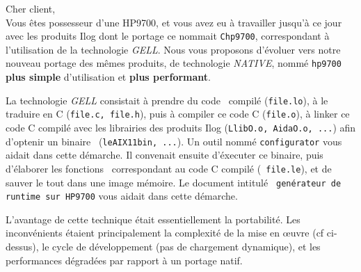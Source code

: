 

\frenchspacing
\setlength{\parindent}{0in}
\setlength{\parskip}{3ex}
\raggedbottom


\bigskip

Cher client, \\
Vous \^{e}tes possesseur d'une HP9700, et 
vous avez eu \`{a} travailler jusqu'\`{a} ce jour avec les produits Ilog
dont le portage ce nommait {\tt Chp9700}, correspondant \`{a}
l'utilisation de la technologie {\it GELL}. Nous vous proposons
d'\'{e}voluer vers notre nouveau portage des m\^{e}mes produits, de
technologie {\it NATIVE}, nomm\'{e} {\tt hp9700} {\bf plus simple}
d'utilisation et {\bf plus performant}. 
\par

La technologie {\it GELL} consistait \`{a} prendre du code
\LeLisp\ compil\'{e} ({\tt file.lo}), \`{a} le traduire en C ({\tt file.c,
file.h}), puis \`{a} compiler ce code C ({\tt file.o}), \`{a} linker ce code
C compil\'{e} avec les librairies des produits Ilog ({\tt LlibO.o,
AidaO.o, ...}) afin d'optenir un binaire \LeLisp\ ({\tt leAIX11bin,
...}). Un outil nomm\'{e} {\tt configurator} vous aidait dans cette d\'{e}marche.
Il convenait ensuite d'\'{e}xecuter ce binaire, puis d'\'{e}laborer
les fonctions \LeLisp\ correspondant au code C compil\'{e} ({\tt
file.le}), et de sauver le tout dans une image m\'{e}moire. Le document
intitul\'{e} {\tt
gen\'{e}rateur de runtime sur HP9700} vous aidait dans cette d\'{e}marche.
\par
L'avantage de cette technique \'{e}tait essentiellement la
portabilit\'{e}. Les inconv\'{e}nients \'{e}taient principalement la
complexit\'{e} de la mise en \oe uvre (cf ci-dessus), le cycle de
d\'{e}veloppement (pas de chargement dynamique), et les performances
d\'{e}grad\'{e}es par rapport \`{a} un portage natif.

